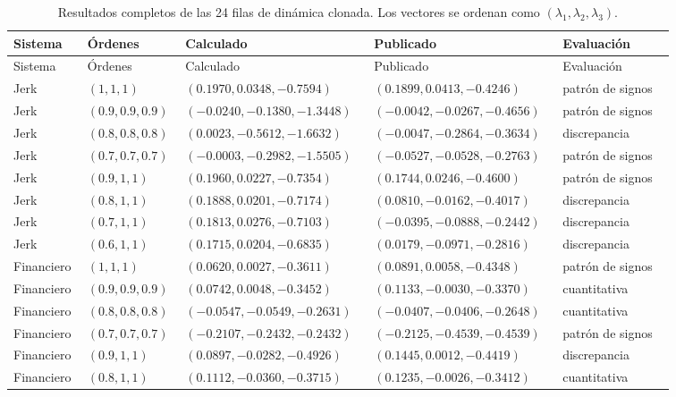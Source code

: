 \begingroup
\scriptsize
\setlength{\tabcolsep}{2pt}
\begin{longtable}{@{}L{0.105\linewidth}L{0.115\linewidth}L{0.24\linewidth}L{0.24\linewidth}L{0.16\linewidth}@{}}
\caption{Resultados completos de las 24 filas de dinámica clonada. Los
vectores se ordenan como \((\lambda_1,\lambda_2,\lambda_3)\).}
\label{tab:fischer-all-results}\\
\toprule
Sistema & Órdenes & Calculado & Publicado & Evaluación\\
\midrule
\endfirsthead
\toprule
Sistema & Órdenes & Calculado & Publicado & Evaluación\\
\midrule
\endhead
Jerk & \((1,1,1)\) & \((0.1970,0.0348,-0.7594)\) & \((0.1899,0.0413,-0.4246)\) & patrón de signos\\
Jerk & \((0.9,0.9,0.9)\) & \((-0.0240,-0.1380,-1.3448)\) & \((-0.0042,-0.0267,-0.4656)\) & patrón de signos\\
Jerk & \((0.8,0.8,0.8)\) & \((0.0023,-0.5612,-1.6632)\) & \((-0.0047,-0.2864,-0.3634)\) & discrepancia\\
Jerk & \((0.7,0.7,0.7)\) & \((-0.0003,-0.2982,-1.5505)\) & \((-0.0527,-0.0528,-0.2763)\) & patrón de signos\\
Jerk & \((0.9,1,1)\) & \((0.1960,0.0227,-0.7354)\) & \((0.1744,0.0246,-0.4600)\) & patrón de signos\\
Jerk & \((0.8,1,1)\) & \((0.1888,0.0201,-0.7174)\) & \((0.0810,-0.0162,-0.4017)\) & discrepancia\\
Jerk & \((0.7,1,1)\) & \((0.1813,0.0276,-0.7103)\) & \((-0.0395,-0.0888,-0.2442)\) & discrepancia\\
Jerk & \((0.6,1,1)\) & \((0.1715,0.0204,-0.6835)\) & \((0.0179,-0.0971,-0.2816)\) & discrepancia\\
Financiero & \((1,1,1)\) & \((0.0620,0.0027,-0.3611)\) & \((0.0891,0.0058,-0.4348)\) & patrón de signos\\
Financiero & \((0.9,0.9,0.9)\) & \((0.0742,0.0048,-0.3452)\) & \((0.1133,-0.0030,-0.3370)\) & cuantitativa\\
Financiero & \((0.8,0.8,0.8)\) & \((-0.0547,-0.0549,-0.2631)\) & \((-0.0407,-0.0406,-0.2648)\) & cuantitativa\\
Financiero & \((0.7,0.7,0.7)\) & \((-0.2107,-0.2432,-0.2432)\) & \((-0.2125,-0.4539,-0.4539)\) & patrón de signos\\
Financiero & \((0.9,1,1)\) & \((0.0897,-0.0282,-0.4926)\) & \((0.1445,0.0012,-0.4419)\) & discrepancia\\
Financiero & \((0.8,1,1)\) & \((0.1112,-0.0360,-0.3715)\) & \((0.1235,-0.0026,-0.3412)\) & cuantitativa\\

\end{longtable}

